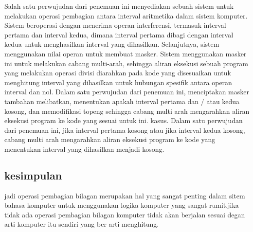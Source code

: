 Salah satu perwujudan dari penemuan ini menyediakan sebuah sistem untuk melakukan operasi pembagian antara interval aritmetika dalam sistem komputer. Sistem beroperasi dengan menerima operan interferensi, termasuk interval pertama dan interval kedua, dimana interval pertama dibagi dengan interval kedua untuk menghasilkan interval yang dihasilkan. Selanjutnya, sistem menggunakan nilai operan untuk membuat masker. Sistem menggunakan masker ini untuk melakukan cabang multi-arah, sehingga aliran eksekusi sebuah program yang melakukan operasi divisi diarahkan pada kode yang disesuaikan untuk menghitung interval yang dihasilkan untuk hubungan spesifik antara operan interval dan nol. Dalam satu perwujudan dari penemuan ini, menciptakan masker tambahan melibatkan, menentukan apakah interval pertama dan / atau kedua kosong, dan memodifikasi topeng sehingga cabang multi arah mengarahkan aliran eksekusi program ke kode yang sesuai untuk ini. kasus. Dalam satu perwujudan dari penemuan ini, jika interval pertama kosong atau jika interval kedua kosong, cabang multi arah mengarahkan aliran eksekusi program ke kode yang menentukan interval yang dihasilkan menjadi kosong.

\subsection {kesimpulan}
jadi operasi pembagian bilagan merupakan hal yang sangat penting dalam sitem bahasa komputer untuk menggunakan logika komputer yang sangat rumit.jika tidak ada operasi pembagian bilagan komputer tidak akan berjalan sesuai degan arti komputer itu sendiri yang ber arti menghitung.

